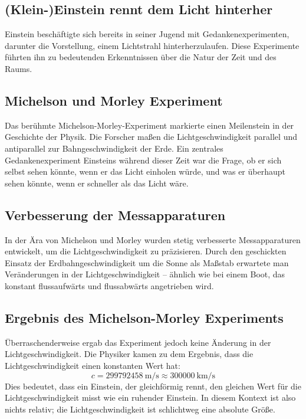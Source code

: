 \documentclass[a4paper]{report}
\begin{document}
\subsection{(Klein-)Einstein rennt dem Licht hinterher}
Einstein beschäftigte sich bereits in seiner Jugend mit Gedankenexperimenten, darunter die Vorstellung, einem Lichtstrahl hinterherzulaufen. Diese Experimente führten ihn zu bedeutenden Erkenntnissen über die Natur der Zeit und des Raums.
\subsection{Michelson und Morley Experiment}
Das berühmte Michelson-Morley-Experiment markierte einen Meilenstein in der Geschichte der Physik. Die Forscher maßen die Lichtgeschwindigkeit parallel und antiparallel zur Bahngeschwindigkeit der Erde. Ein zentrales Gedankenexperiment Einsteins während dieser Zeit war die Frage, ob er sich selbst sehen könnte, wenn er das Licht einholen würde, und was er überhaupt sehen könnte, wenn er schneller als das Licht wäre.
\subsection{Verbesserung der Messapparaturen}
In der Ära von Michelson und Morley wurden stetig verbesserte Messapparaturen entwickelt, um die Lichtgeschwindigkeit zu präzisieren. Durch den geschickten Einsatz der Erdbahngeschwindigkeit um die Sonne als Maßstab erwartete man Veränderungen in der Lichtgeschwindigkeit – ähnlich wie bei einem Boot, das konstant flussaufwärts und flussabwärts angetrieben wird.
\subsection{Ergebnis des Michelson-Morley Experiments}
\sloppy
Überraschenderweise ergab das Experiment jedoch keine Änderung in der Lichtgeschwindigkeit.
Die Physiker kamen zu dem Ergebnis, dass die Lichtgeschwindigkeit einen konstanten Wert hat: 
$$c = \SI{299792458}{\meter\per\second} \approx \SI{300000}{\kilo\meter\per\second}$$
Dies bedeutet, dass ein Einstein, der gleichförmig rennt, den gleichen Wert für die Lichtgeschwindigkeit misst wie ein ruhender Einstein. 
In diesem Kontext ist also nichts relativ; die Lichtgeschwindigkeit ist schlichtweg eine absolute Größe.
\end{document}
